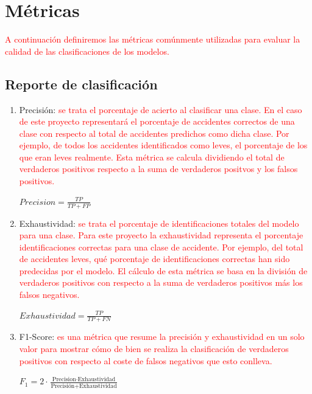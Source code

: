     \section{Métricas}

        \textcolor{red}{A continuación definiremos las métricas comúnmente utilizadas para evaluar la calidad de las clasificaciones de los modelos.}


        \subsection{Reporte de clasificación}

        \begin{enumerate}

            \item Precisión: \textcolor{red}{se trata el porcentaje de acierto al clasificar una clase. En el caso de este proyecto representará el porcentaje de accidentes correctos de una clase con respecto al total de accidentes predichos como dicha clase. Por ejemplo, de todos los accidentes identificados como leves, el porcentaje de los que eran leves realmente. Esta métrica se calcula dividiendo el total de verdaderos positivos respecto a la suma de verdaderos positvos y los falsos positivos.}

                \begin{center}
                    $Precision = \frac{TP}{TP + FP}$
                \end{center}

            \item Exhaustividad: \textcolor{red}{se trata el porcentaje de identificaciones totales del modelo para una clase. Para este proyecto la exhaustividad representa el porcentaje identificaciones correctas para una clase de accidente. Por ejemplo, del total de accidentes leves, qué porcentaje de identificaciones correctas han sido predecidas por el modelo. El cálculo de esta métrica se basa en la división de verdaderos positivos con respecto a la suma de verdaderos positivos más los falsos negativos.}

                \begin{center}
                    $Exhaustividad = \frac{TP}{TP + FN}$
                \end{center}

            \item F1-Score: \textcolor{red}{es una métrica que resume la precisión y exhaustividad en un solo valor para mostrar cómo de bien se realiza la clasificación de verdaderos positivos con respecto al coste de falsos negativos que esto conlleva.}

                \begin{center}
                    $F_{1} = 2 \cdot \frac{\text{Precision} \cdot \text{Exhaustividad}} {\text{Precisión} + \text{Exhaustividad}}$
                \end{center}

        \end{enumerate}

